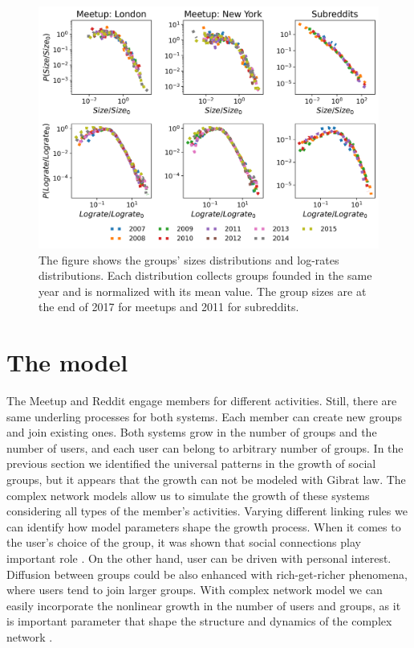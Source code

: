 \begin{figure}[h]
	\centering
	\includegraphics[width=0.8\linewidth]{Figures/figures/Fig1.png}
	\caption{The figure shows the groups' sizes distributions and log-rates distributions. Each distribution collects groups founded in the same year and is normalized with its mean value. The group sizes are at the end of 2017 for meetups and 2011 for subreddits.}
	\label{fig:scale}
\end{figure}

\section{The model}

The Meetup and Reddit engage members for different activities. Still, there are same underling processes for both systems. Each member can create new groups and join existing ones. Both systems grow in the number of groups and the number of users, and each user can belong to arbitrary number of groups. In the previous section we identified the universal patterns in the growth of social groups, but it appears that the growth can not be modeled with Gibrat law. The complex network models allow us to simulate the growth of these systems considering all types of the member's activities. Varying different linking rules we can identify how model parameters shape the growth process. When it comes to the user's choice of the group, it was shown that social connections play important role \cite{kairam2012life, zheleva2009co}. On the other hand, user can be driven with personal interest. Diffusion between groups could be also enhanced with rich-get-richer phenomena, where users tend to join larger groups. With complex network model we can easily incorporate the nonlinear growth in the number of users and groups, as it is important parameter that shape the structure and dynamics of the complex network \cite{mitrovic2011quantitative, dankulov2015dynamics, vranic2021growth}.

